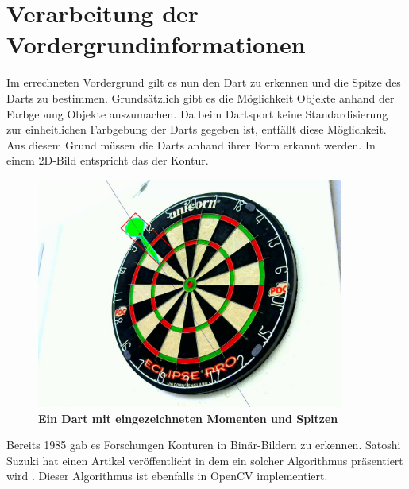 \section{Verarbeitung der Vordergrundinformationen}
\label{sec:foreground}
Im errechneten Vordergrund gilt es nun den Dart zu erkennen und die Spitze des Darts zu bestimmen. Grundsätzlich gibt es die Möglichkeit Objekte anhand der Farbgebung Objekte auszumachen. Da beim Dartsport keine Standardisierung zur einheitlichen Farbgebung der Darts gegeben ist, entfällt diese Möglichkeit. Aus diesem Grund müssen die Darts anhand ihrer Form erkannt werden. In einem 2D-Bild entspricht das der Kontur.
\begin{figure}[ht]
\centering
\includegraphics[width=0.9\textwidth]{media/backgroundfeature}
\caption{\textbf{Ein Dart mit eingezeichneten Momenten und Spitzen}}
\label{Fig:detecteddart}
\end{figure}

Bereits 1985 gab es Forschungen Konturen in Binär-Bildern zu erkennen. Satoshi Suzuki hat einen Artikel veröffentlicht in dem ein solcher Algorithmus präsentiert wird \autocite{contour1985}. Dieser Algorithmus ist ebenfalls in OpenCV implementiert. 

